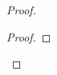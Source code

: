 \documentclass[11pt,a4paper]{amsart}
\theoremstyle{plain}
\newtheorem*{claimproof}{Proof of the claim}{\itshape}{\rmfamily}
\newtheorem{claimnumb}{Claim}[theorem]{\itshape}{\rmfamily}
\theoremstyle{definition}
\DeclareMathOperator{\supp}{supp}
\begin{document}
\begin{proof}
\begin{proof}


\end{proof}
\end{proof}
\end{document}
